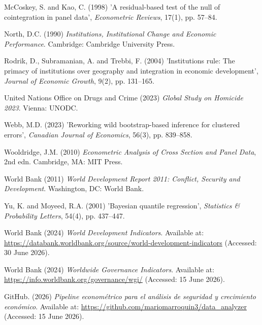 \documentclass[11pt,a4paper]{article}
\begin{document}
McCoskey, S. and Kao, C. (1998) 'A residual-based test of the null of cointegration in panel data', \textit{Econometric Reviews}, 17(1), pp. 57--84.

North, D.C. (1990) \textit{Institutions, Institutional Change and Economic Performance}. Cambridge: Cambridge University Press.

Rodrik, D., Subramanian, A. and Trebbi, F. (2004) 'Institutions rule: The primacy of institutions over geography and integration in economic development', \textit{Journal of Economic Growth}, 9(2), pp. 131--165.

United Nations Office on Drugs and Crime (2023) \textit{Global Study on Homicide 2023}. Vienna: UNODC.

Webb, M.D. (2023) 'Reworking wild bootstrap-based inference for clustered errors', \textit{Canadian Journal of Economics}, 56(3), pp. 839--858.

Wooldridge, J.M. (2010) \textit{Econometric Analysis of Cross Section and Panel Data}, 2nd edn. Cambridge, MA: MIT Press.

World Bank (2011) \textit{World Development Report 2011: Conflict, Security and Development}. Washington, DC: World Bank.

Yu, K. and Moyeed, R.A. (2001) 'Bayesian quantile regression', \textit{Statistics \& Probability Letters}, 54(4), pp. 437--447.

World Bank (2024) \textit{World Development Indicators}. Available at:
\url{https://databank.worldbank.org/source/world-development-indicators}
(Accessed: 30 June 2026).

World Bank (2024) \textit{Worldwide Governance Indicators}. Available at:
\url{https://info.worldbank.org/governance/wgi/}
(Accessed: 15 June 2026).

GitHub. (2026) \textit{Pipeline econométrico para el análisis de seguridad y crecimiento económico}. Available at:
\url{https://github.com/mariomarroquin3/data_analyzer}
(Accessed: 15 June 2026).
\end{document}
